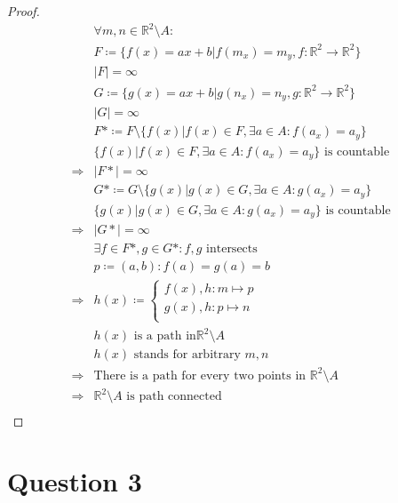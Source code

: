 \documentclass{article}
\begin{document}
\begin{proof}
    \begin{align*}
        &\forall m,n\in \mathbb{R} ^2\setminus A:\\
        &F\coloneqq\{f(x)=ax+b|f(m_x)=m_y,f:\mathbb{R} ^2\rightarrow\mathbb{R} ^2\}\\
        &|F|=\infty\\
        &G\coloneqq \{g(x)=ax+b|g(n_x)=n_y,g:\mathbb{R} ^2\rightarrow\mathbb{R} ^2\}\\
        &|G|=\infty\\
        &F*\coloneqq F\setminus\{f(x)|f(x)\in F, \exists a\in A:f(a_x)=a_y\}\\
        &\{f(x)|f(x)\in F, \exists a\in A:f(a_x)=a_y\}\text{ is countable}\\
        \Rightarrow&|F*|=\infty\\
        &G*\coloneqq G\setminus\{g(x)|g(x)\in G, \exists a\in A:g(a_x)=a_y\}\\
        &\{g(x)|g(x)\in G, \exists a\in A:g(a_x)=a_y\}\text{ is countable}\\
        \Rightarrow&|G*|=\infty\\
        &\exists f\in F*,g\in G*:f,g\text{ intersects}\\
        &p\coloneqq(a,b):f(a)=g(a)=b\\
        \Rightarrow&h(x)\coloneqq\begin{cases}
            f(x),h:m\mapsto p\\
            g(x),h:p\mapsto n\\
        \end{cases}\\
        &h(x)\text{ is a path in}\mathbb{R} ^2\setminus A\\
        &h(x)\text{ stands for arbitrary }m,n\\
        \Rightarrow&\text{There is a path for every two points in }\mathbb{R} ^2\setminus A\\
        \Rightarrow&\mathbb{R} ^2\setminus A\text{ is path connected}\\
    \end{align*}
\end{proof}

\newpage

\section*{Question 3}

~
\end{document}
